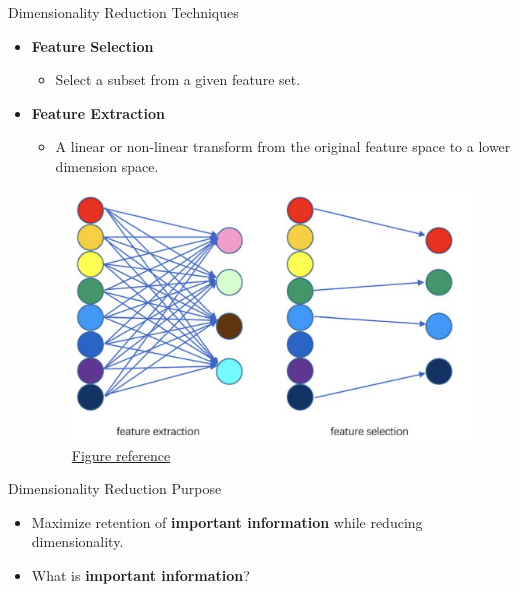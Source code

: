 \documentclass[serif, aspectratio=169]{beamer}
\begin{document}
\begin{frame}{Dimensionality Reduction Techniques}
    \begin{itemize}
        \item \textbf{Feature Selection}
            \begin{itemize}
                \item Select a subset from a given feature set.
            \end{itemize}

         \item \textbf{Feature Extraction}
            \begin{itemize}
                \item A linear or non-linear transform from the original feature space to a lower dimension space.
            \end{itemize}
            \begin{figure}[htpb]
                \begin{center}
                    \includegraphics[keepaspectratio, scale=0.20]{pic/FS-FE.png}
                    \caption{\href{https://link.springer.com/article/10.1007/s00500-019-04628-6}{Figure reference}}
                \end{center}
            \end{figure}
    \end{itemize}
\end{frame}

\begin{frame}{Dimensionality Reduction Purpose}
    \begin{itemize}
        \item Maximize retention of  \textbf{important information} while reducing dimensionality.
        
        \item What is \textbf{important information}?
    \end{itemize}
\end{frame}
\end{document}
